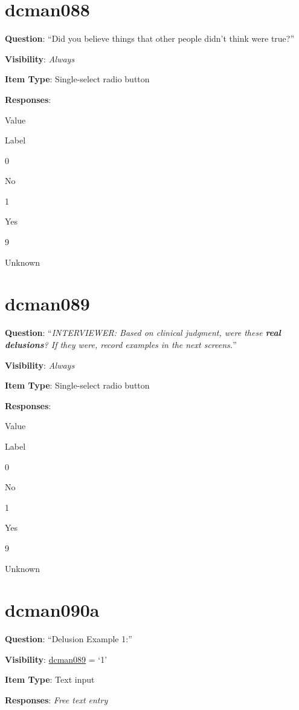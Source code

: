 \documentclass[]{book}
\begin{document}
\hypertarget{dcman088}{%
\section{dcman088}\label{dcman088}}

\textbf{Question}: ``Did you believe things that other people didn't think were true?''

\textbf{Visibility}: \emph{Always}

\textbf{Item Type}: Single-select radio button

\textbf{Responses}:

Value

Label

0

No

1

Yes

9

Unknown

\hypertarget{dcman089}{%
\section{dcman089}\label{dcman089}}

\textbf{Question}: ``\emph{INTERVIEWER: Based on clinical judgment, were these
\textbf{real delusions}? If they were, record examples in the next screens.}''

\textbf{Visibility}: \emph{Always}

\textbf{Item Type}: Single-select radio button

\textbf{Responses}:

Value

Label

0

No

1

Yes

9

Unknown

\hypertarget{dcman090a}{%
\section{dcman090a}\label{dcman090a}}

\textbf{Question}: ``Delusion Example 1:''

\textbf{Visibility}: \protect\hyperlink{dcman089}{dcman089} = `1'

\textbf{Item Type}: Text input

\textbf{Responses}: \emph{Free text entry}
\end{document}
